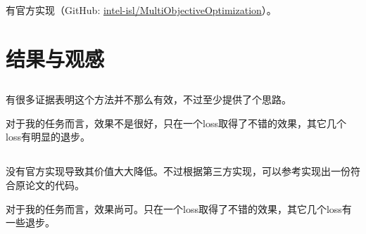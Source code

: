 \documentclass{ctexart}
\begin{document}
\subsubsection{}

有官方实现（GitHub: \href{https://github.com/intel-isl/MultiObjectiveOptimization}{intel-isl/MultiObjectiveOptimization}）。

\section{结果与观感}

\subsection{}

有很多证据表明这个方法并不那么有效，不过至少提供了个思路。

对于我的任务而言，效果不是很好，只在一个loss取得了不错的效果，其它几个loss有明显的退步。

\subsection{}

没有官方实现导致其价值大大降低。不过根据第三方实现，可以参考实现出一份符合原论文的代码。

对于我的任务而言，效果尚可。只在一个loss取得了不错的效果，其它几个loss有一些退步。

\subsection{}


\end{document}
